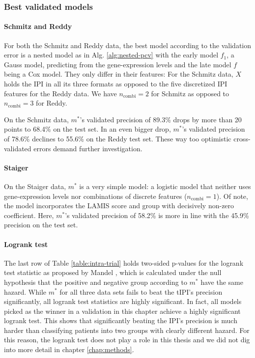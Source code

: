 \subsubsection{Best validated models}

\paragraph{Schmitz and Reddy}
For both the Schmitz and Reddy data, the best model according to the validation error is a nested 
model as in Alg. \ref{alg:nested-pcv} with the early model $f_1$, a Gauss model, predicting from 
the gene-expression levels and the late model $f$ being a Cox model. They only differ in their 
features: For the Schmitz data, $X$ holds the IPI in all its three formats as opposed to the five 
discretized IPI features for the Reddy data. We have $n_\text{combi} = 2$ for Schmitz as opposed to 
$n_\text{combi} = 3$ for Reddy.

On the Schmitz data, $m^*$'s validated precision of \num{89.3}\% drops by more than \num{20} points 
to \num{68.4}\% on the test set. In an even bigger drop, $m^*$'s validated precision of \num{78.6}\% 
declines to \num{55.6}\% on the Reddy test set. These way too optimistic cross-validated errors 
demand further investigation.

\paragraph{Staiger}
On the Staiger data, $m^*$ is a very simple model: a logistic model that neither uses 
gene-expression levels nor combinations of discrete features ($n_\text{combi} = 1$). Of note, the 
model incorporates the LAMIS score and group with decisively non-zero coefficient. Here, $m^*$'s 
validated precision of \num{58.2}\% is more in line with the \num{45.9}\% precision on the test set.

\paragraph{Logrank test}
The last row of Table \ref{table:intra-trial} holds two-sided p-values for the logrank test
statistic as proposed by Mandel \cite{mantel66}, which is calculated under the null hypothesis 
that the positive and negative group according to $m^*$ have the same hazard. While $m^*$ for all 
three data sets fails to beat the tIPI's precision significantly, all logrank test statistics are 
highly significant. In fact, all models picked as the winner in a validation in this chapter 
achieve a highly significant logrank test. This shows that significantly beating the 
IPI's precision is much harder than classifying patients into two groups with clearly different 
hazard. For this reason, the logrank test does not play a role in this thesis and we did not dig 
into more detail in chapter \ref{chap:methods}.

